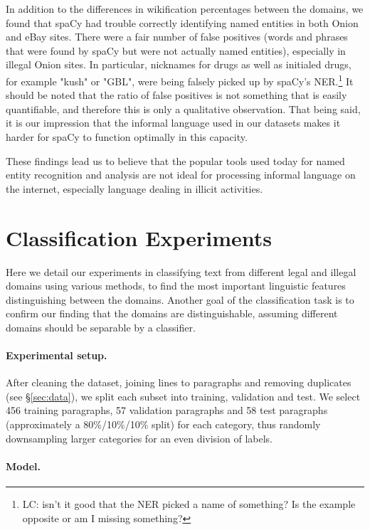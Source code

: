 \documentclass[11pt,a4paper,table]{article}
\newcommand{\lc}[1]{\footnote{\color{blue}LC: #1}}
\begin{document}
In addition to the differences in wikification percentages between
the domains, we found that spaCy had trouble correctly identifying
named entities in both Onion and eBay sites. There were a fair number
of false positives (words and phrases that were found by spaCy but
were not actually named entities),
especially in illegal Onion sites. In particular, nicknames for drugs as well as initialed drugs, for example "kush" or "GBL", were being falsely picked up by spaCy's NER.\lc{isn't it good that the NER picked a name of something? Is the example opposite or am I missing something?}
It should be noted that the ratio of false positives is not something that is easily quantifiable, and therefore this is only a qualitative observation. That being said, it is our impression that the informal language used in our datasets makes it harder
for spaCy to function optimally in this capacity.

These findings lead us to believe that the popular tools used today
for named entity recognition and analysis are not ideal for processing
informal language on the internet, especially language dealing in
illicit activities. 

\section{Classification Experiments}

Here we detail our experiments in classifying text from different legal and
illegal domains using various methods, to find the most important linguistic features
distinguishing between the domains. Another goal of the classification task is to confirm our finding that the domains are distinguishable, assuming different domains should be separable by a classifier.

\paragraph{Experimental setup.}

After cleaning the dataset, joining lines to paragraphs and removing duplicates
(see \S\ref{sec:data}), we split each subset into training, validation and test.
We select 456 training paragraphs, 57 validation paragraphs and
58 test paragraphs (approximately a 80\%/10\%/10\% split) for each category,
thus randomly downsampling larger categories for an even division of labels.

\paragraph{Model.}
\end{document}
